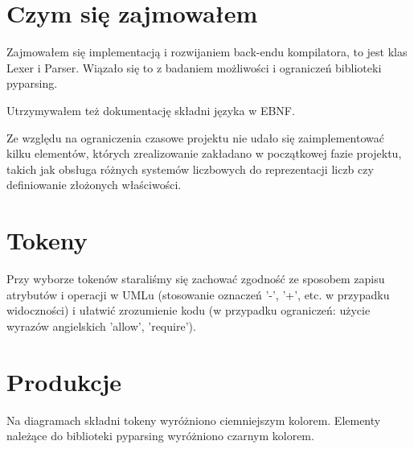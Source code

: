 \documentclass[a4paper,11pt,notitlepage]{article}
\begin{document}
\section{Czym się zajmowałem}
Zajmowałem się implementacją i rozwijaniem back-endu kompilatora, to jest klas Lexer i Parser. Wiązało się to z badaniem możliwości i ograniczeń biblioteki pyparsing.

Utrzymywałem też dokumentację składni języka w EBNF.

Ze względu na ograniczenia czasowe projektu nie udało się zaimplementować kilku elementów, których zrealizowanie zakładano w początkowej fazie projektu, takich jak obsługa różnych systemów liczbowych do reprezentacji liczb czy definiowanie złożonych właściwości.

\section{Tokeny}
Przy wyborze tokenów staraliśmy się zachować zgodność ze sposobem zapisu atrybutów i operacji w UMLu (stosowanie oznaczeń '-', '+', etc. w przypadku widoczności) i ułatwić zrozumienie kodu (w przypadku ograniczeń: użycie wyrazów angielskich 'allow', 'require').


\section{Produkcje}
Na diagramach składni tokeny wyróżniono ciemniejszym kolorem. Elementy należące do biblioteki pyparsing wyróżniono czarnym kolorem.
\end{document}
